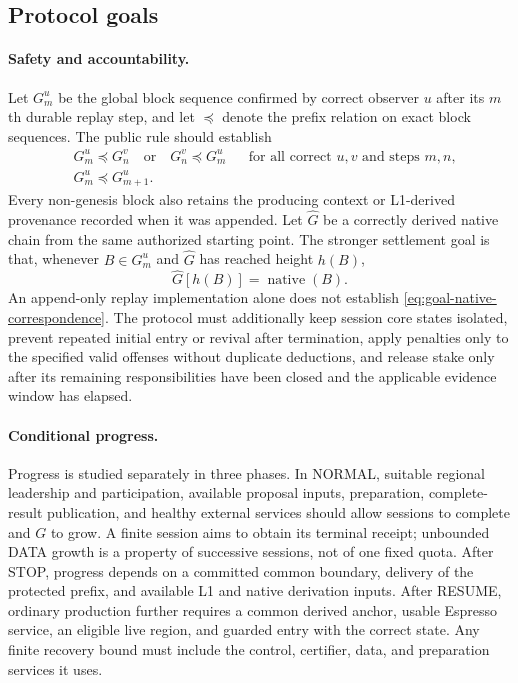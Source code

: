 \subsection{Protocol goals}
\label{sec:protocol-goals}

\paragraph{Safety and accountability.}
Let $G_m^u$ be the global block sequence confirmed by correct observer
$u$ after its $m$th durable replay step, and let $\preceq$ denote the
prefix relation on exact block sequences.  The public rule should
establish
\begin{align}
\label{eq:goal-agreement}
 &G_m^u\preceq G_n^v\quad\text{or}\quad G_n^v\preceq G_m^u
 &&\text{for all correct }u,v\text{ and steps }m,n,\\
\label{eq:goal-persistence}
 &G_m^u\preceq G_{m+1}^u.
\end{align}
Every non-genesis block also retains the producing context or L1-derived
provenance recorded when it was appended.  Let $\widehat G$ be a
correctly derived native chain from the same authorized starting point.
The stronger settlement goal is that, whenever $B\in G_m^u$ and
$\widehat G$ has reached height $h(B)$,
\begin{equation}
\label{eq:goal-native-correspondence}
 \widehat G[h(B)]=\operatorname{native}(B).
\end{equation}
An append-only replay implementation alone does not establish
\eqref{eq:goal-native-correspondence}.  The protocol must additionally
keep session core states isolated, prevent repeated initial entry or
revival after termination, apply penalties only to the specified valid
offenses without duplicate deductions, and release stake only after its
remaining responsibilities have been closed and the applicable evidence
window has elapsed.

\paragraph{Conditional progress.}
Progress is studied separately in three phases.  In NORMAL, suitable
regional leadership and participation, available proposal inputs,
preparation, complete-result publication, and healthy external services
should allow sessions to complete and $G$ to grow.  A finite session
aims to obtain its terminal receipt; unbounded DATA growth is a property
of successive sessions, not of one fixed quota.  After STOP, progress
depends on a committed common boundary, delivery of the protected
prefix, and available L1 and native derivation inputs.  After RESUME,
ordinary production further requires a common derived anchor, usable
Espresso service, an eligible live region, and guarded entry with the
correct state.  Any finite recovery bound must include the control,
certifier, data, and preparation services it uses.

